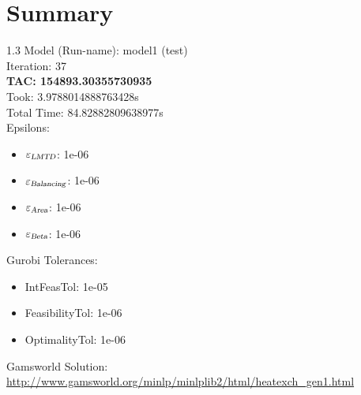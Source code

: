 \documentclass{article}%
\begin{document}
%
\normalsize%
\section{Summary}%
\thispagestyle{plain}%
\begin{spacing}{1.3}%
\Large%
Model (Run-name): model1 (test)\\%
Iteration: 37\\%
\textbf{TAC: 154893.30355730935}\\%
Took: 3.9788014888763428s\\%
Total Time: 84.82882809638977s\\%
Epsilons:%
\begin{itemize}%
	\item $\varepsilon_{\textsl{LMTD}}$: 1e-06%
	\item $\varepsilon_{\textsl{Balancing}}$: 1e-06%
	\item $\varepsilon_{\textsl{Area}}$: 1e-06%
	\item $\varepsilon_{\textsl{Beta}}$: 1e-06%
\end{itemize}%
Gurobi Tolerances:%
\begin{itemize}%
	\item IntFeasTol: 1e-05%
	\item FeasibilityTol: 1e-06%
	\item OptimalityTol: 1e-06%
\end{itemize}%
\end{spacing}%
\normalsize%
Gamsworld Solution: \url{http://www.gamsworld.org/minlp/minlplib2/html/heatexch_gen1.html}%
%
\clearpage%
\end{document}

